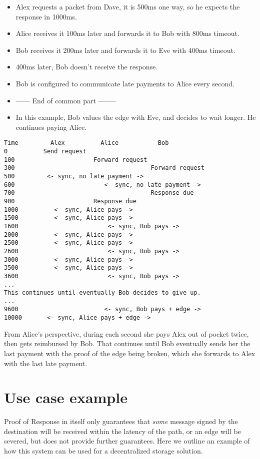 \documentclass{article}
\begin{document}
\begin{itemize}
    \item Alex requests a packet from Dave, it is 500ms one way, so he expects the response in 1000ms.
    \item Alice receives it 100ms later and forwards it to Bob with 800ms timeout.
    \item Bob receives it 200ms later and forwards it to Eve with 400ms timeout.
    \item 400ms later, Bob doesn't receive the response.
    \item Bob is configured to communicate late payments to Alice every second.
    \item ------ End of common part --------
    \item In this example, Bob values the edge with Eve, and decides to wait longer. He continues paying Alice.
\end{itemize}

\begin{verbatim}
Time         Alex          Alice           Bob
0          Send request
100                      Forward request
300                                      Forward request
500         <- sync, no late payment ->
600                         <- sync, no late payment ->
700                                      Response due
900                      Response due
1000          <- sync, Alice pays ->
1500          <- sync, Alice pays ->
1600                         <- sync, Bob pays ->
2000          <- sync, Alice pays ->
2500          <- sync, Alice pays ->
2600                         <- sync, Bob pays ->
3000          <- sync, Alice pays ->
3500          <- sync, Alice pays ->
3600                         <- sync, Bob pays ->
...
This continues until eventually Bob decides to give up.
...
9600                        <- sync, Bob pays + edge ->
10000       <- sync, Alice pays + edge ->
\end{verbatim}

From Alice's perspective, during each second she pays Alex out of pocket twice, then gets reimbursed by Bob. That continues until Bob eventually sends her the last payment with the proof of the edge being broken, which she forwards to Alex with the last late payment.

\section{Use case example}

Proof of Response in itself only guarantees that \textit{some} message signed by the destination will be received within the latency of the path, or an edge will be severed, but does not provide further guarantees. Here we outline an example of how this system can be used for a decentralized storage solution.
\end{document}
